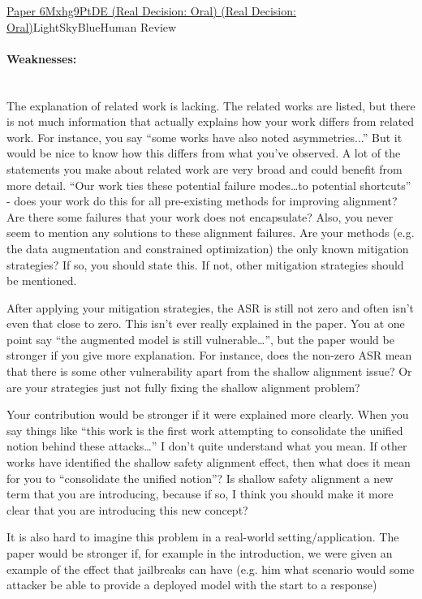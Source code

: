 \documentclass{article} %
\begin{document}
\begin{reviewbox}{\href{https://openreview.net/forum?id=6Mxhg9PtDE}{Paper 6Mxhg9PtDE (Real Decision: Oral) (Real Decision: Oral)}}{LightSkyBlue}{Human Review}
\paragraph{Weaknesses:}\leavevmode\\[0.1em]
The explanation of related work is lacking. The related works are listed, but there is not much information that actually explains how your work differs from related work. For instance, you say “some works have also noted asymmetries...” But it would be nice to know how this differs from what you’ve observed. A lot of the statements you make about related work are very broad and could benefit from more detail. “Our work ties these potential failure modes…to potential shortcuts” - does your work do this for all pre-existing methods for improving alignment? Are there some failures that your work does not encapsulate? Also, you never seem to mention any solutions to these alignment failures. Are your methods (e.g. the data augmentation and constrained optimization) the only known mitigation strategies? If so, you should state this. If not, other mitigation strategies should be mentioned.

After applying your mitigation strategies, the ASR is still not zero and often isn’t even that close to zero. This isn’t ever really explained in the paper. You at one point say “the augmented model is still vulnerable…”, but the paper would be stronger if you give more explanation. For instance, does the non-zero ASR mean that there is some other vulnerability apart from the shallow alignment issue? Or are your strategies just not fully fixing the shallow alignment problem?

Your contribution would be stronger if it were explained more clearly. When you say things like “this work is the first work attempting to consolidate the unified notion behind these attacks…” I don’t quite understand what you mean. If other works have identified the shallow safety alignment effect, then what does it mean for you to “consolidate the unified notion”? Is shallow safety alignment a new term that you are introducing, because if so, I think you should make it more clear that you are introducing this new concept?

It is also hard to imagine this problem in a real-world setting/application. The paper would be stronger if, for example in the introduction, we were given an example of the effect that jailbreaks can have (e.g. him what scenario would some attacker be able to provide a deployed model with the start to a response)


\end{reviewbox}
\end{document}

